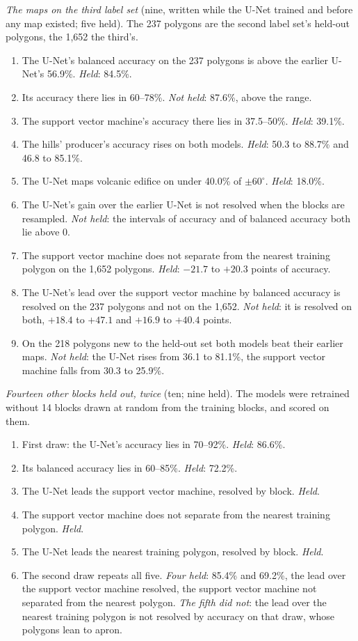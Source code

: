 \documentclass[twocolumn]{aastex701}
\newcommand{\pmsixty}{$\pm60^{\circ}$}
\begin{document}
\emph{The maps on the third label set} (nine, written while the U-Net trained and before any map existed; five
held). The 237 polygons are the second label set's held-out polygons, the 1,652 the third's.
\begin{enumerate}
\item[P1] The U-Net's balanced accuracy on the 237 polygons is above the earlier U-Net's 56.9\%. \emph{Held}: 84.5\%.
\item[P2] Its accuracy there lies in 60--78\%. \emph{Not held}: 87.6\%, above the range.
\item[P3] The support vector machine's accuracy there lies in 37.5--50\%. \emph{Held}: 39.1\%.
\item[P4] The hills' producer's accuracy rises on both models. \emph{Held}: 50.3 to 88.7\% and 46.8 to 85.1\%.
\item[P5] The U-Net maps volcanic edifice on under 40.0\% of \pmsixty. \emph{Held}: 18.0\%.
\item[P6] The U-Net's gain over the earlier U-Net is not resolved when the blocks are resampled. \emph{Not held}:
the intervals of accuracy and of balanced accuracy both lie above 0.
\item[P7] The support vector machine does not separate from the nearest training polygon on the 1,652 polygons.
\emph{Held}: $-21.7$ to $+20.3$ points of accuracy.
\item[P8] The U-Net's lead over the support vector machine by balanced accuracy is resolved on the 237 polygons and
not on the 1,652. \emph{Not held}: it is resolved on both, $+18.4$ to $+47.1$ and $+16.9$ to $+40.4$ points.
\item[P9] On the 218 polygons new to the held-out set both models beat their earlier maps. \emph{Not held}: the
U-Net rises from 36.1 to 81.1\%, the support vector machine falls from 30.3 to 25.9\%.
\end{enumerate}

\emph{Fourteen other blocks held out, twice} (ten; nine held). The models were retrained without 14 blocks drawn at
random from the training blocks, and scored on them.
\begin{enumerate}
\item[F1] First draw: the U-Net's accuracy lies in 70--92\%. \emph{Held}: 86.6\%.
\item[F2] Its balanced accuracy lies in 60--85\%. \emph{Held}: 72.2\%.
\item[F3] The U-Net leads the support vector machine, resolved by block. \emph{Held}.
\item[F4] The support vector machine does not separate from the nearest training polygon. \emph{Held}.
\item[F5] The U-Net leads the nearest training polygon, resolved by block. \emph{Held}.
\item[F6] The second draw repeats all five. \emph{Four held}: 85.4\% and 69.2\%, the lead over the support vector
machine resolved, the support vector machine not separated from the nearest polygon. \emph{The fifth did not}: the
lead over the nearest training polygon is not resolved by accuracy on that draw, whose polygons lean to apron.
\end{enumerate}
\end{document}
